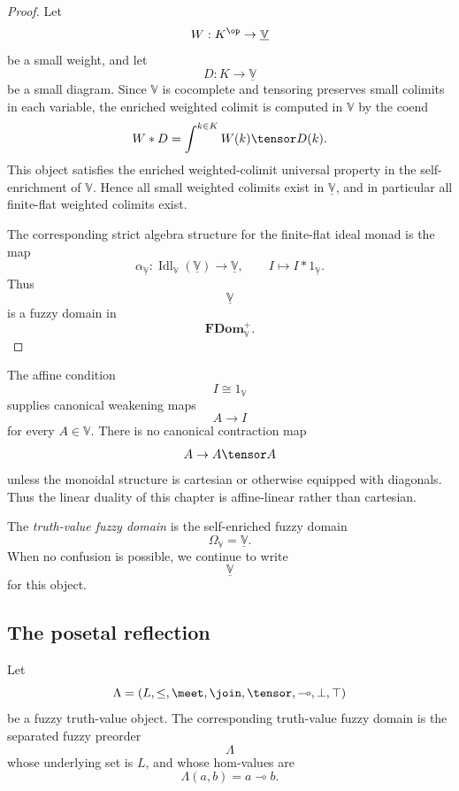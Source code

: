 \begin{proof}
Let
\[
    W:K^{\op}\to\underline{\mathbb V}
\]
be a small weight, and let
\[
    D:K\to\underline{\mathbb V}
\]
be a small diagram.  Since \(\mathbb V\) is cocomplete and tensoring preserves
small colimits in each variable, the enriched weighted colimit is computed in
\(\mathbb V\) by the coend
\[
    W*D
    =
    \int^{k\in K} W(k)\tensor D(k).
\]
This object satisfies the enriched weighted-colimit universal property in the
self-enrichment of \(\mathbb V\).  Hence all small weighted colimits exist in
\(\underline{\mathbb V}\), and in particular all finite-flat weighted colimits
exist.

The corresponding strict algebra structure for the finite-flat ideal monad is
the map
\[
    \alpha_{\underline{\mathbb V}}:
    \operatorname{Idl}_{\mathbb V}(\underline{\mathbb V})
    \to
    \underline{\mathbb V},
    \qquad
    I\longmapsto I*1_{\underline{\mathbb V}}.
\]
Thus
\[
    \underline{\mathbb V}
\]
is a fuzzy domain in
\[
    \mathbf{FDom}_{\mathbb V}^{+}.
\]
\end{proof}

The affine condition
\[
    I\cong 1_{\mathbb V}
\]
supplies canonical weakening maps
\[
    A\to I
\]
for every \(A\in\mathbb V\).  There is no canonical contraction map
\[
    A\to A\tensor A
\]
unless the monoidal structure is cartesian or otherwise equipped with
diagonals.  Thus the linear duality of this chapter is affine-linear rather
than cartesian.

\begin{definition}
\label{def:truth-value-fuzzy-domain}
The \emph{truth-value fuzzy domain} is the self-enriched fuzzy domain
\[
    \Omega_{\mathbb V}
    =
    \underline{\mathbb V}.
\]
When no confusion is possible, we continue to write
\[
    \underline{\mathbb V}
\]
for this object.
\end{definition}

\subsection{The posetal reflection}
\label{subsec:truth-value-domain-posetal}

Let
\[
    \Lambda=(L,\leq,\meet,\join,\tensor,\multimap,\bot,\top)
\]
be a fuzzy truth-value object.  The corresponding truth-value fuzzy domain is
the separated fuzzy preorder
\[
    \Lambda
\]
whose underlying set is \(L\), and whose hom-values are
\[
    \Lambda(a,b)=a\multimap b.
\]

